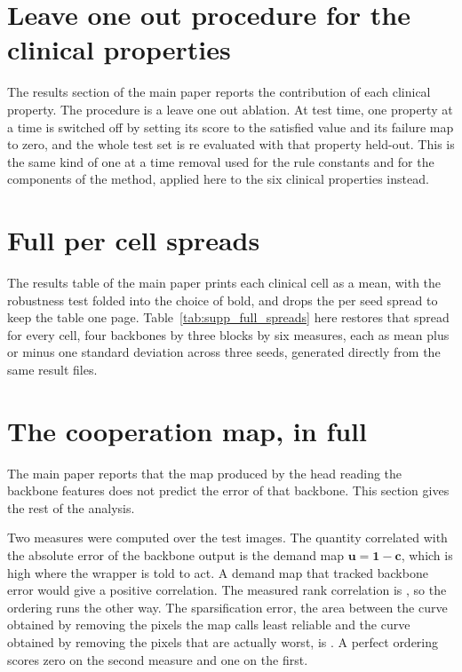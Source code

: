 \section{Leave one out procedure for the clinical properties}
\label{sec:supp_studies}

The results section of the main paper reports the contribution of each clinical property. The procedure is
a leave one out ablation. At test time, one property at a time is switched off by setting its score
to the satisfied value and its failure map to zero, and the whole test set is re evaluated with that
property held-out. This is the same kind of one at a time removal used for the rule constants and for
the components of the method, applied here to the six clinical properties instead.

\section{Full per cell spreads}
\label{sec:supp_full_spreads}

The results table of the main paper prints each clinical cell as a mean, with the robustness
test folded into the choice of bold, and drops the per seed spread to keep the table one page.
Table~\ref{tab:supp_full_spreads} here restores that spread for every cell, four backbones by three
blocks by six measures, each as mean plus or minus one standard deviation across three seeds,
generated directly from the same result files.

\begin{table}[!tb]
\centering
\caption{Every clinical cell of Tables 4 and 5 of the main paper, with its full mean plus or minus one seed
standard deviation restored. Each cell here is the one those tables show as a mean alone, and bold marks a mean that exceeds
its spread.}
\label{tab:supp_full_spreads}
\setlength{\tabcolsep}{4pt}
\footnotesize

\end{table}

\section{The cooperation map, in full}
\label{sec:supp_cooperation}

The main paper reports that the map produced by the head reading the backbone features does not
predict the error of that backbone. This section gives the rest of the analysis.

Two measures were computed over the \NImages{} test images. The quantity correlated with the
absolute error of the backbone output is the demand map $\mathbf{u} = \mathbf{1} - \mathbf{c}$, which
is high where the wrapper is told to act. A demand map that tracked backbone error would give a
positive correlation. The measured rank correlation is \CalibRho{}, so the ordering runs the other
way. The sparsification error, the area between the curve obtained by removing the pixels the map
calls least reliable and the curve obtained by removing the pixels that are actually worst, is
\CalibAuse{}. A perfect ordering scores zero on the second measure and one on the first.

